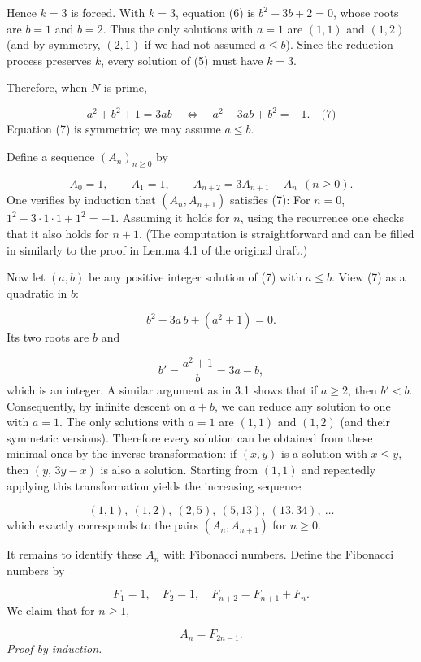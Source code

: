 Hence \(k=3\) is forced. With \(k=3\), equation (6) is \(b^{2}-3b+2=0\), whose roots are \(b=1\) and \(b=2\). Thus the only solutions with \(a=1\) are \((1,1)\) and \((1,2)\) (and by symmetry, \((2,1)\) if we had not assumed \(a\le b\)). Since the reduction process preserves \(k\), every solution of (5) must have \(k=3\).\par
Therefore, when \(N\) is prime,\par
\[
a^{2}+b^{2}+1 = 3ab \quad\Longleftrightarrow\quad a^{2} - 3ab + b^{2} = -1. \quad\text{(7)}
\]
Equation (7) is symmetric; we may assume \(a \le b\).\par
Define a sequence \((A_n)_{n\ge 0}\) by\par
\[
A_0 = 1,\qquad A_1 = 1,\qquad A_{n+2} = 3A_{n+1} - A_n\ \ (n\ge 0).
\]
One verifies by induction that \((A_n, A_{n+1})\) satisfies (7): For \(n=0\), \(1^2-3\cdot1\cdot1+1^2=-1\). Assuming it holds for \(n\), using the recurrence one checks that it also holds for \(n+1\). (The computation is straightforward and can be filled in similarly to the proof in Lemma 4.1 of the original draft.)\par
Now let \((a,b)\) be any positive integer solution of (7) with \(a \le b\). View (7) as a quadratic in \(b\):\par
\[
b^{2} - 3a\, b + (a^{2}+1) = 0.
\]
Its two roots are \(b\) and\par
\[
b' = \frac{a^{2}+1}{b} = 3a - b,
\]
which is an integer. A similar argument as in 3.1 shows that if \(a \ge 2\), then \(b' < b\). Consequently, by infinite descent on \(a+b\), we can reduce any solution to one with \(a=1\). The only solutions with \(a=1\) are \((1,1)\) and \((1,2)\) (and their symmetric versions). Therefore every solution can be obtained from these minimal ones by the inverse transformation: if \((x,y)\) is a solution with \(x \le y\), then \((y,\, 3y - x)\) is also a solution. Starting from \((1,1)\) and repeatedly applying this transformation yields the increasing sequence\par
\[
(1,1),\ (1,2),\ (2,5),\ (5,13),\ (13,34),\ \dots
\]
which exactly corresponds to the pairs \((A_n, A_{n+1})\) for \(n\ge 0\).\par
It remains to identify these \(A_n\) with Fibonacci numbers. Define the Fibonacci numbers by\par
\[
F_1 = 1,\quad F_2 = 1,\quad F_{n+2} = F_{n+1} + F_n.
\]
We claim that for \(n \ge 1\),\par
\[
A_n = F_{2n-1}.
\]
\emph{Proof by induction.}\par
